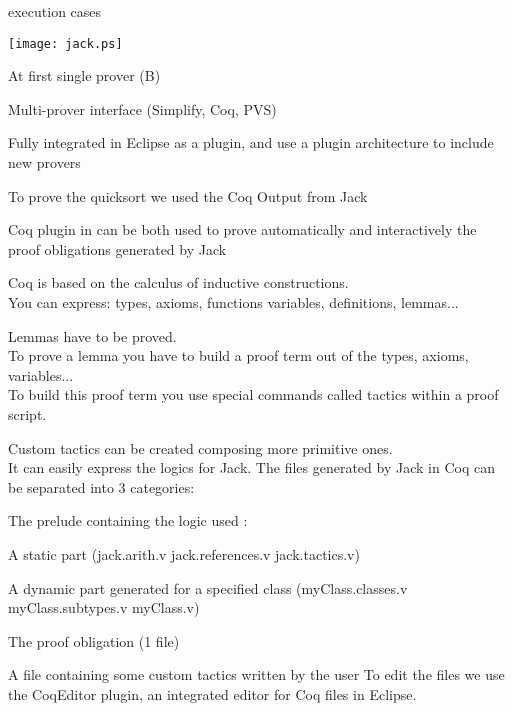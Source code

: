 {\purple execution cases}
\elist
\begin{center}
\texttt{[image: jack.ps]}
\end{center}
\small
\blist
\item At first single prover (B)
\item Multi-prover interface (Simplify, Coq, PVS)
\item Fully integrated in {\purple Eclipse} as a plugin, and use a 
{\purple plugin architecture} to include new provers
\item To prove the quicksort we used the {\purple Coq Output} from Jack
\item Coq plugin in can be both used to prove {\purple automatically and
interactively} the proof obligations generated by Jack
\elist

\small
Coq is based on the {\purple calculus of inductive constructions}.\\
You can express: types, axioms, functions
variables, definitions, {\purple lemmas}...

Lemmas have to be proved.\\
To prove a lemma you have to build a {\purple proof term} out of the types, 
axioms, variables... \\
To build this proof term you use special commands 
called {\purple tactics} within a proof script.

{\purple Custom tactics} can be created composing more primitive ones.\\

It can easily express the logics for Jack.
\small
The files generated by Jack in Coq can be separated into 3 categories:
\blist 
\item The {\purple prelude} containing the logic used :
\blist 
\item A static part (jack.arith.v jack.references.v jack.tactics.v)
\item A dynamic part generated for a specified class (myClass.classes.v 
myClass.subtypes.v myClass.v)

\elist
\item The {\purple proof obligation} (1 file)
\item A file containing some {\purple custom tactics} written by the user
\elist
To edit the files we use the {\purple CoqEditor} plugin, an integrated editor for Coq files in Eclipse.
